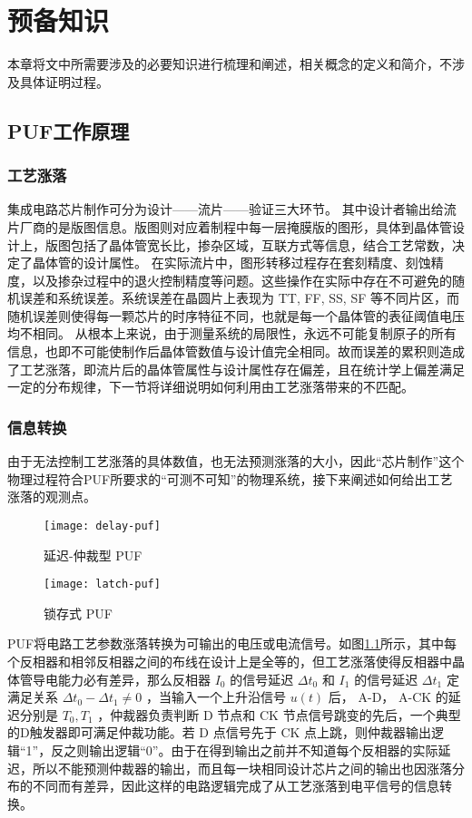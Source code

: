 
\chapter{预备知识}\label{chap:preliminary}
本章将文中所需要涉及的必要知识进行梳理和阐述，相关概念的定义和简介，不涉及具体证明过程。

\section{PUF工作原理}%
\subsection{工艺涨落}%
集成电路芯片制作可分为设计——流片——验证三大环节。
其中设计者输出给流片厂商的是版图信息。版图则对应着制程中每一层掩膜版的图形，具体到晶体管设计上，版图包括了晶体管宽长比，掺杂区域，互联方式等信息，结合工艺常数，决定了晶体管的设计属性。
在实际流片中，图形转移过程存在套刻精度、刻蚀精度，以及掺杂过程中的退火控制精度等问题。这些操作在实际中存在不可避免的随机误差和系统误差。系统误差在晶圆片上表现为 TT, FF, SS, SF 等不同片区，而随机误差则使得每一颗芯片的时序特征不同，也就是每一个晶体管的表征阈值电压均不相同。
从根本上来说，由于测量系统的局限性，永远不可能复制原子的所有信息，也即不可能使制作后晶体管数值与设计值完全相同。故而误差的累积则造成了工艺涨落，即流片后的晶体管属性与设计属性存在偏差，且在统计学上偏差满足一定的分布规律，下一节将详细说明如何利用由工艺涨落带来的不匹配。
\subsection{信息转换}
由于无法控制工艺涨落的具体数值，也无法预测涨落的大小，因此``芯片制作''这个物理过程符合PUF所要求的``可测不可知''的物理系统，接下来阐述如何给出工艺涨落的观测点。

\begin{figure}[htb!]
\centering
\texttt{[image: delay-puf]}
\caption{延迟-仲裁型 PUF}
\label{fig:delay-puf}
\end{figure}
 
 \begin{figure}[htb!]
 \centering
 \texttt{[image: latch-puf]}
 \caption{锁存式 PUF}
 \label{fig:latch-puf}
 \end{figure}

PUF将电路工艺参数涨落转换为可输出的电压或电流信号。如图\ref{fig:delay-puf}所示，其中每个反相器和相邻反相器之间的布线在设计上是全等的，但工艺涨落使得反相器中晶体管导电能力必有差异，那么反相器 $ I_0 $ 的信号延迟 $ \Delta t_0 $ 和 $ I_1 $ 的信号延迟 $ \Delta t_1 $ 定满足关系 $ \Delta t_0-\Delta t_1\neq 0 $ ，当输入一个上升沿信号 $ u(t) $ 后， A-D， A-CK  的延迟分别是 $ T_0,T_1 $ ，仲裁器负责判断 D 节点和 CK 节点信号跳变的先后，一个典型的D触发器即可满足仲裁功能。若 D 点信号先于 CK 点上跳，则仲裁器输出逻辑``1''，反之则输出逻辑``0''。由于在得到输出之前并不知道每个反相器的实际延迟，所以不能预测仲裁器的输出，而且每一块相同设计芯片之间的输出也因涨落分布的不同而有差异，因此这样的电路逻辑完成了从工艺涨落到电平信号的信息转换。

